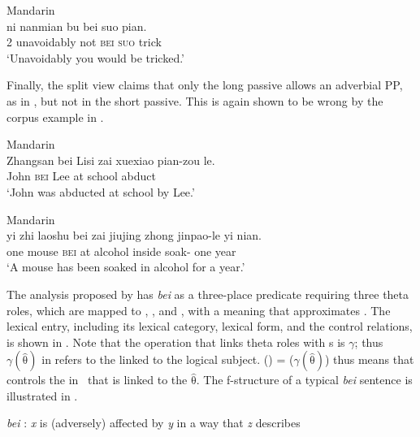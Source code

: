 \documentclass[output=paper,chinesefont,hidelinks]{langscibook}
\begin{document}
\ea%
    \label{ex:Sinitic:30}Mandarin\\
    \gll ni  nanmian  bu  bei  suo  pian.\\
        {2\SG}  unavoidably  not  \textsc{bei}  \textsc{suo}  trick\\
    \glt`Unavoidably you would be tricked.'
    \z

  Finally, the split view claims that only the long passive allows an adverbial PP, as in , but not in the short passive. This is again shown to be wrong by the corpus example in .

\ea%
    \label{ex:Sinitic:31}Mandarin\\
    \gll Zhangsan bei   Lisi  zai  xuexiao  pian-zou  le.\\
         John         \textsc{bei}  Lee   at    school    abduct     \PFV\\
    \glt`John was abducted at school by Lee.'
    \z

\ea%
    \label{ex:Sinitic:32}Mandarin\\
    \gll yi  zhi  laoshu  bei   zai   jiujing   zhong  jinpao-le  yi    nian.\\
         one  {\CLF}   mouse  \textsc{bei}  at    alcohol  inside  soak-{\PFV}  one  year\\
    \glt`A mouse has been soaked in alcohol for a year.'
    \z

    The analysis proposed by \citet{Her2009} has \textit{bei} as a three-place predicate requiring three theta roles, which are mapped to {\SUBJ}, {\OBJ}, and \XCOMP, with a meaning that approximates . The lexical entry, including its lexical category, lexical form, and the control relations, is shown in . Note that the operation that links theta roles with {\GF}s is $\gamma$; thus $\gamma(\widehat{\mbox{θ}})$ in  refers to the {\GF} linked to the logical subject. (\UP\OBJ) = (\UP\XCOMP $\gamma(\widehat{\mbox{θ}})$) thus means that {\OBJ} controls the {\GF} in \XCOMP\ that is linked to the $\widehat{\mbox{θ}}$. The f-structure of a typical \textit{bei} sentence is illustrated in .

\ea%
    \label{ex:Sinitic:33}
    \textit{bei} : \textit{x} is (adversely) affected by \textit{y} in a way that \textit{z} describes
    \z

\ea%
    \label{ex:Sinitic:34}
    \z
\end{document}
